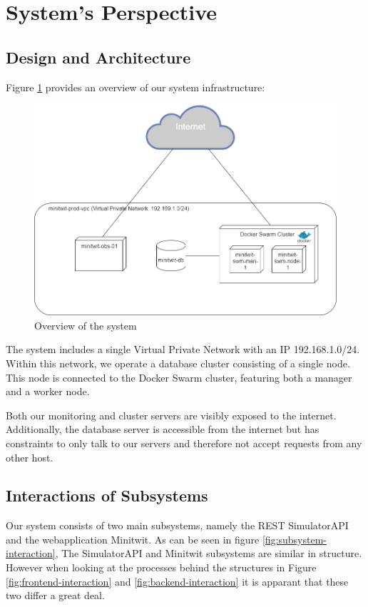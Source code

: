 \section{System's Perspective}

\subsection{Design and Architecture}
Figure \ref{fig:systemoverview} provides an overview of our system infrastructure:
\begin{figure}[H]
    \centering
    \includegraphics[width=0.7\linewidth]{images/system-overview3.png}
    \caption{Overview of the system}
    \label{fig:systemoverview}

\end{figure}
The system includes a single Virtual Private Network with an IP 192.168.1.0/24. Within this network, we operate a database cluster consisting of a single node. This node is connected to the Docker Swarm cluster, featuring both a manager and a worker node.

Both our monitoring and cluster servers are visibly exposed to the internet. Additionally, the database server is accessible from the internet but has constraints to only talk to our servers and therefore not accept requests from any other host.

\subsection{Interactions of Subsystems}
Our system consists of two main subsystems, namely the REST SimulatorAPI and the webapplication Minitwit. As can be seen in figure \ref{fig:subsystem-interaction}, The SimulatorAPI and Minitwit subsystems are similar in structure. However when looking at the processes behind the structures in Figure \ref{fig:frontend-interaction} and \ref{fig:backend-interaction} it is apparant that these two differ a great deal.

